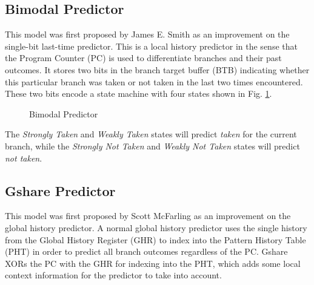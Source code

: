 \documentclass[conference]{IEEEtran}
\begin{document}
\subsection{Bimodal Predictor} \label{ssec:bimodal}
This model was first proposed by James E. Smith as an improvement on the single-bit last-time predictor\cite{smith1981}. This is a local history predictor in the sense that the Program Counter (PC) is used to differentiate branches and their past outcomes. It stores two bits in the branch target buffer (BTB) indicating whether this particular branch was taken or not taken in the last two times encountered. These two bits encode a state machine with four states shown in Fig. 
\ref{fig:bimodal}. 
\begin{figure}
    \centering
    \caption{Bimodal Predictor}
	\label{fig:bimodal}
\end{figure}
The \textit{Strongly Taken} and \textit{Weakly Taken} states will predict \textit{taken} for the current branch, while the \textit{Strongly Not Taken} and \textit{Weakly Not Taken} states will predict \textit{not taken}.

\subsection{Gshare Predictor} \label{ssec:gshare}
This model was first proposed by Scott McFarling as an improvement on the global history predictor\cite{mcfarling1993}. A normal global history predictor uses the single history from the Global History Register (GHR) to index into the Pattern History Table (PHT) in order to predict all branch outcomes regardless of the PC. Gshare XORs the PC with the GHR for indexing into the PHT, which adds some local context information for the predictor to take into account.
\end{document}

